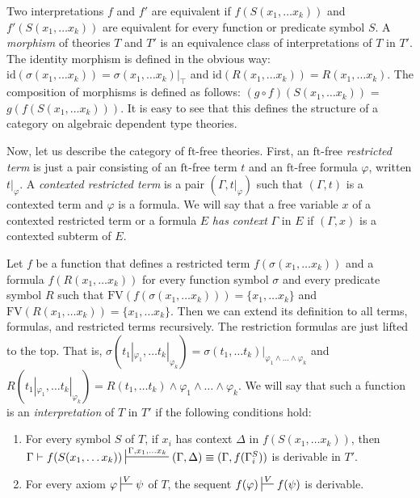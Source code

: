 \documentclass[reqno]{amsart}
\theoremstyle{definition}
\theoremstyle{remark}
\newcommand{\fs}[1]{\mathrm{#1}}
\newcommand{\FV}{\fs{FV}}
\newcommand{\ft}{\fs{ft}}
\newcommand{\id}{\fs{id}}
\numberwithin{figure}{section}
\begin{document}
Two interpretations $f$ and $f'$ are equivalent if $f(S(x_1, \ldots x_k))$ and $f'(S(x_1, \ldots x_k))$ are equivalent for every function or predicate symbol $S$.
A \emph{morphism} of theories $T$ and $T'$ is an equivalence class of interpretations of $T$ in $T'$.
The identity morphism is defined in the obvious way: $\id(\sigma(x_1, \ldots x_k)) = \sigma(x_1, \ldots x_k)|_\top$ and $\id(R(x_1, \ldots x_k)) = R(x_1, \ldots x_k)$.
The composition of morphisms is defined as follows: $(g \circ f)(S(x_1, \ldots x_k))$ = $g(f(S(x_1, \ldots x_k)))$.
It is easy to see that this defines the structure of a category on algebraic dependent type theories.

Now, let us describe the category of $\ft$-free theories.
First, an $\ft$-free \emph{restricted term} is just a pair consisting of an $\ft$-free term $t$ and an $\ft$-free formula $\varphi$, written $t|_\varphi$.
A \emph{contexted restricted term} is a pair $(\Gamma,t|_\varphi)$ such that $(\Gamma,t)$ is a contexted term and $\varphi$ is a formula.
We will say that a free variable $x$ of a contexted restricted term or a formula $E$ \emph{has context} $\Gamma$ in $E$ if $(\Gamma,x)$ is a contexted subterm of $E$.

Let $f$ be a function that defines a restricted term $f(\sigma(x_1, \ldots x_k))$ and a formula $f(R(x_1, \ldots x_k))$ for every function symbol $\sigma$ and every predicate symbol $R$ such that $\FV(f(\sigma(x_1, \ldots x_k))) = \{ x_1, \ldots x_k \}$ and $\FV(R(x_1, \ldots x_k)) = \{ x_1, \ldots x_k \}$.
Then we can extend its definition to all terms, formulas, and restricted terms recursively.
The restriction formulas are just lifted to the top.
That is, $\sigma(t_1|_{\varphi_1}, \ldots t_k|_{\varphi_k}) = \sigma(t_1, \ldots t_k)|_{\varphi_1 \land \ldots \land \varphi_k}$ and $R(t_1|_{\varphi_1}, \ldots t_k|_{\varphi_k}) = R(t_1, \ldots t_k) \land \varphi_1 \land \ldots \land \varphi_k$.
We will say that such a function is an \emph{interpretation} of $T$ in $T'$ if the following conditions hold:
\begin{enumerate}
\item \label{it:interp-symb} For every symbol $S$ of $T$, if $x_i$ has context $\Delta$ in $f(S(x_1, \ldots x_k))$, then $\Gamma \vdash f(S(x_1, \ldots x_k)) \sststile{}{\Gamma, x_1, \ldots x_k} (\Gamma, \Delta) \equiv (\Gamma, f(\Gamma^S_i))$ is derivable in $T'$.
\item \label{it:interp-axiom} For every axiom $\varphi \sststile{}{V} \psi$ of $T$, the sequent $f(\varphi) \sststile{}{V} f(\psi)$ is derivable.
\end{enumerate}
\end{document}
